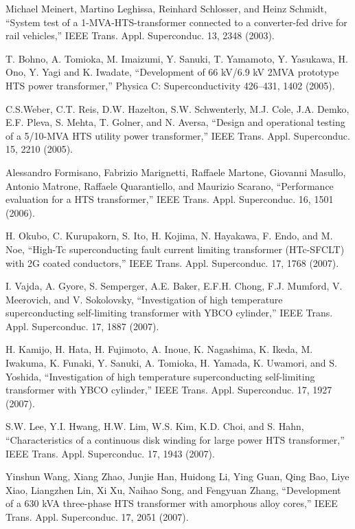 \noindent [9.163] Michael Meinert, Martino Leghissa, Reinhard Schlosser, and Heinz Schmidt, ``System
test of a 1-MVA-HTS-transformer connected to a converter-fed drive for rail
vehicles,” IEEE Trans. Appl. Superconduc. 13, 2348 (2003).

\noindent [9.164] T. Bohno, A. Tomioka, M. Imaizumi, Y. Sanuki, T. Yamamoto, Y. Yasukawa,
H. Ono, Y. Yagi and K. Iwadate, ``Development of 66 kV/6.9 kV 2MVA prototype
HTS power transformer,” Physica C: Superconductivity 426–431, 1402 (2005).

\noindent [9.165] C.S.Weber, C.T. Reis, D.W. Hazelton, S.W. Schwenterly, M.J. Cole, J.A. Demko,
E.F. Pleva, S. Mehta, T. Golner, and N. Aversa, ``Design and operational testing
of a 5/10-MVA HTS utility power transformer,” IEEE Trans. Appl. Superconduc.
15, 2210 (2005).

\noindent [9.166] Alessandro Formisano, Fabrizio Marignetti, Raffaele Martone, Giovanni Masullo,
Antonio Matrone, Raffaele Quarantiello, and Maurizio Scarano, ``Performance
evaluation for a HTS transformer,” IEEE Trans. Appl. Superconduc. 16, 1501
(2006).

\noindent [9.167] H. Okubo, C. Kurupakorn, S. Ito, H. Kojima, N. Hayakawa, F. Endo, and M. Noe,
``High-Tc superconducting fault current limiting transformer (HTc-SFCLT) with
2G coated conductors,” IEEE Trans. Appl. Superconduc. 17, 1768 (2007).

\noindent [9.168] I. Vajda, A. Gyore, S. Semperger, A.E. Baker, E.F.H. Chong, F.J. Mumford,
V. Meerovich, and V. Sokolovsky, ``Investigation of high temperature superconducting
self-limiting transformer with YBCO cylinder,” IEEE Trans. Appl. Superconduc.
17, 1887 (2007).

\noindent [9.169] H. Kamijo, H. Hata, H. Fujimoto, A. Inoue, K. Nagashima, K. Ikeda, M. Iwakuma,
K. Funaki, Y. Sanuki, A. Tomioka, H. Yamada, K. Uwamori, and S. Yoshida,
``Investigation of high temperature superconducting self-limiting transformer with
YBCO cylinder,” IEEE Trans. Appl. Superconduc. 17, 1927 (2007).

\noindent [9.170] S.W. Lee, Y.I. Hwang, H.W. Lim, W.S. Kim, K.D. Choi, and S. Hahn, ``Characteristics
of a continuous disk winding for large power HTS transformer,” IEEE
Trans. Appl. Superconduc. 17, 1943 (2007).

\noindent [9.171] Yinshun Wang, Xiang Zhao, Junjie Han, Huidong Li, Ying Guan, Qing Bao, Liye
Xiao, Liangzhen Lin, Xi Xu, Naihao Song, and Fengyuan Zhang, ``Development
of a 630 kVA three-phase HTS transformer with amorphous alloy cores,” IEEE
Trans. Appl. Superconduc. 17, 2051 (2007).

